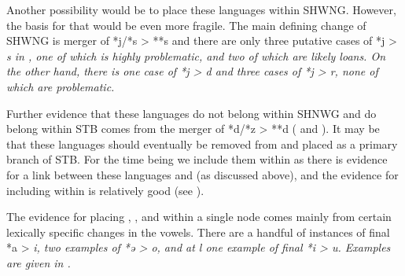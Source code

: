 Another possibility would be to place these languages within SHWNG.
However, the basis for that would be even more fragile.
The main defining change of SHWNG is merger of *j/*s > **s \citep[52]{Kamholz2014}
and there are only three putative cases of *j > \it{s} in , one of which is highly problematic,
and two of which are likely loans.
On the other hand,
there is one case of *j > \it{d}
and three cases of *j > \it{r},
none of which are problematic.

Further evidence that these languages do not belong within SHNWG
and do belong within STB comes from the merger of *d/*z > **d ( and ).
It may be that these languages should eventually be removed from
 and placed as a primary branch of STB.
For the time being we include them within 
as there is evidence for a link between these languages
and  (as discussed above),
and the evidence for including  within 
is relatively good (see ).

The evidence for placing ,
, and  within a single node comes mainly from
certain lexically specific changes in the vowels.
There are a handful of instances of final *a > \it{i},
two examples of *ə > \it{o},
and at l one example of final *i > \it{u}.
Examples are given in .

